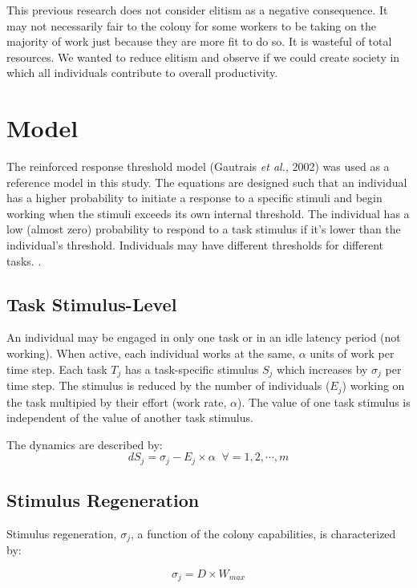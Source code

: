\documentclass[a4paper]{article}
\begin{document}
This previous research does not consider elitism as a negative consequence.  It may not necessarily fair to the colony for some workers to be taking on the majority of work just because they are more fit to do so.  It is wasteful of total resources. We wanted to reduce elitism and observe if we could create society in which all individuals contribute to overall productivity. 

\section{Model}
The reinforced response threshold model (Gautrais \textit{et al.}, 2002) was used as a reference model in this study. The equations are designed such that an individual has a higher probability to initiate a response to a specific stimuli and begin working when the stimuli exceeds its own internal threshold.  The individual has a low (almost zero) probability to respond to a task stimulus if it's lower than the individual's threshold. Individuals may have different thresholds for different tasks. \cite{Gautrais}. 


\subsection{Task Stimulus-Level}
An individual may be engaged in only one task or in an idle latency period (not working).  When active, each individual works at the same, $\alpha$ units of work per time step.  Each task $T_j$ has a task-specific stimulus $S_j$ which increases by $\sigma_j$ per time step.  The stimulus is reduced by the number of individuals ($E_j$) working on the task multipied by their effort (work rate, $\alpha$). The value of one task stimulus is independent of the value of another task stimulus.  


The dynamics are described by:
\begin{equation}
dS_j = \sigma_j - E_j \times \alpha \;\; \forall = 1,2,\cdots,m
\end{equation}

\subsection{Stimulus Regeneration}


Stimulus regeneration, $\sigma_j$, a function of the colony capabilities, is characterized by:

\begin{equation}
\sigma_j = D \times W_{max}
\end{equation}
\end{document}
